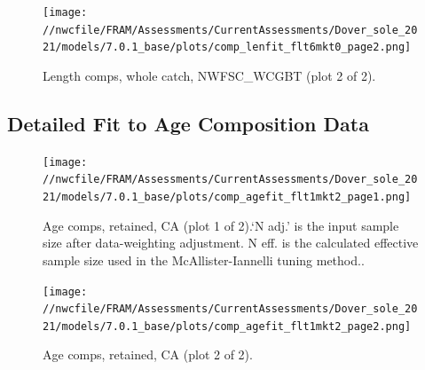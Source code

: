 \documentclass[11pt,
  english,
  a4paper,
]{article}
\begin{document}
\tagmcend\tagstructend


\begin{figure}
\centering
\texttt{[image: //nwcfile/FRAM/Assessments/CurrentAssessments/Dover\_sole\_2021/models/7.0.1\_base/plots/comp\_lenfit\_flt6mkt0\_page2.png]}
\caption{Length comps, whole catch, NWFSC\_WCGBT (plot 2 of 2).\label{fig:comp_lenfit_flt6mkt0_page2}}
\end{figure}

\tagmcend\tagstructend

\clearpage


\hypertarget{detailed-fit-to-age-composition-data}{%
\subsection{Detailed Fit to Age Composition Data}\label{detailed-fit-to-age-composition-data}}

\leavevmode\tagmcend\tagstructend


\begin{figure}
\centering
\texttt{[image: //nwcfile/FRAM/Assessments/CurrentAssessments/Dover\_sole\_2021/models/7.0.1\_base/plots/comp\_agefit\_flt1mkt2\_page1.png]}
\caption{Age comps, retained, CA (plot 1 of 2).`N adj.' is the input sample size after data-weighting adjustment. N eff. is the calculated effective sample size used in the McAllister-Iannelli tuning method..\label{fig:comp_agefit_flt1mkt2_page1}}
\end{figure}

\tagmcend\tagstructend


\begin{figure}
\centering
\texttt{[image: //nwcfile/FRAM/Assessments/CurrentAssessments/Dover\_sole\_2021/models/7.0.1\_base/plots/comp\_agefit\_flt1mkt2\_page2.png]}
\caption{Age comps, retained, CA (plot 2 of 2).\label{fig:comp_agefit_flt1mkt2_page2}}
\end{figure}
\end{document}

